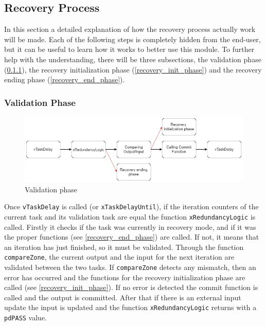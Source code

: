 \documentclass[a4paper, 12pt]{article}
\begin{document}
\begin{onehalfspace}
\subsection{Recovery Process}\label{trm:recovery_process}
In this section a detailed explanation of how the recovery process actually work will be made. Each of the following steps is completely hidden from the end-user, but it can be useful to learn how it works to better use this module. To further help with the understanding, there will be three subsections, the validation phase (\ref{validation_phase}), the recovery initialization phase (\ref{recovery_init_phase}) and the recovery ending phase (\ref{recovery_end_phase}).
\subsubsection{Validation Phase}\label{validation_phase}
\begin{figure}[h]
\includegraphics[width=\textwidth]{images/validation phase.png}
\caption{Validation phase}
\end{figure}
Once \texttt{vTaskDelay} is called (or \texttt{xTaskDelayUntil}), if the iteration counters of the current task and its validation task are equal the function \texttt{xRedundancyLogic} is called. Firstly it checks if the task was currently in recovery mode, and if it was the proper functions (see \ref{recovery_end_phase}) are called. If not, it means that an iteration has just finished, so it must be validated. Through the function \texttt{compareZone}, the current output and the input for the next iteration are validated between the two tasks. If \texttt{compareZone} detects any mismatch, then an error has occurred and the functions for the recovery initialization phase are called (see \ref{recovery_init_phase}). If no error is detected the commit function is called and the output is committed. After that if there is an external input update the input is updated and the function \texttt{xRedundancyLogic} returns with a \texttt{pdPASS} value.

\end{onehalfspace}
\end{document}
